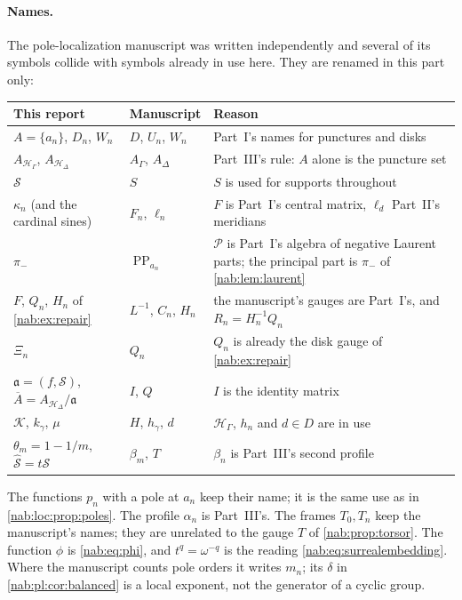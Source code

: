 \documentclass[11pt,letterpaper]{article}
\theoremstyle{definition}
\theoremstyle{remark}
\newcommand{\HH}{\mathscr H_\Gamma}
\newcommand{\PP}{\mathcal P}
\newcommand{\HD}{\mathscr H_\Delta}
\numberwithin{equation}{section}
\begin{document}
\paragraph{Names.} The pole-localization manuscript was written independently
and several of its symbols collide with symbols already in use here. They are
renamed in this part only:
\begin{center}\small
\begin{tabular}{@{}L{0.27\textwidth}L{0.24\textwidth}L{0.39\textwidth}@{}}
\toprule
This report & Manuscript & Reason\\
\midrule
$A=\{a_n\}$, $D_n$, $W_n$ & $D$, $U_n$, $W_n$ & Part~I's names for punctures
and disks\\[0.3em]
$A_{\HH}$, $A_{\HD}$ & $A_\Gamma$, $A_\Delta$ & Part~III's rule: $A$ alone is
the puncture set\\[0.3em]
$\mathcal S$ & $S$ & $S$ is used for supports throughout\\[0.3em]
$\kappa_n$ (and the cardinal sines) & $F_n$, $\ell_n$ & $F$ is Part~I's
central matrix, $\ell_d$ Part~II's meridians\\[0.3em]
$\pi_-$ & $\operatorname{PP}_{a_n}$ & $\PP$ is Part~I's algebra of negative
Laurent parts; the principal part is $\pi_-$ of \cref{nab:lem:laurent}\\[0.3em]
$F$, $Q_n$, $H_n$ of \cref{nab:ex:repair} & $L^{-1}$, $C_n$, $H_n$ & the
manuscript's gauges are Part~I's, and $R_n=H_n^{-1}Q_n$\\[0.3em]
$\Xi_n$ & $Q_n$ & $Q_n$ is already the disk gauge of \cref{nab:ex:repair}\\[0.3em]
$\mathfrak a=(f,\mathcal S)$, $\overline A=A_{\HD}/\mathfrak a$ & $I$, $Q$ &
$I$ is the identity matrix\\[0.3em]
$\mathcal K$, $k_\gamma$, $\mu$ & $H$, $h_\gamma$, $d$ & $\HH$, $h_n$ and
$d\in D$ are in use\\[0.3em]
$\theta_m=1-1/m$, $\widehat{\mathcal S}=t\mathcal S$ & $\beta_m$, $T$ &
$\beta_n$ is Part~III's second profile\\
\bottomrule
\end{tabular}
\end{center}
The functions $p_n$ with a pole at $a_n$ keep their name; it is the same use as
in \cref{nab:loc:prop:poles}. The profile $\alpha_n$ is Part~III's. The frames
$T_0,T_n$ keep the manuscript's names; they are unrelated to the gauge $T$ of
\cref{nab:prop:torsor}. The function $\phi$ is \eqref{nab:eq:phi}, and
$t^q=\omega^{-q}$ is the reading \eqref{nab:eq:surrealembedding}. Where the
manuscript counts pole orders it writes $m_n$; its $\delta$ in
\cref{nab:pl:cor:balanced} is a local exponent, not the generator of a cyclic
group.
\end{document}
